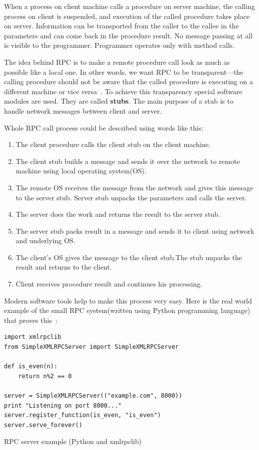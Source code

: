 When a process on client machine calls a
procedure on server machine, the calling process on client is suspended, and
execution of the called procedure takes place on server. Information can be
transported from the caller to the callee in the parameters and can come back in the procedure result.
No message passing at all is visible to the programmer. Programmer operates only
with method calls.

The idea behind RPC is to make a remote procedure call look as much as possible
like a local one. In other words, we want RPC to be transparent—the calling
procedure should not be aware that the called procedure is executing on a different
machine or vice versa~\cite{tanenbaum07}. To achieve this transparency special
software modules are used. They are called \textbf{stubs}. The main purpose
of a stub is to handle network messages between client and server. 

Whole RPC call process could be described using words like this: 
\begin{enumerate}
\item The client procedure calls the client stub on the client machine.
\item The client stub builds a message and sends it over the network to remote
machine using local operating system(OS).
\item The remote  OS  receives the message from the network and gives
this message to the server stub. Server stub unpacks the parameters and calls
the server.
\item The server does the work and returns the result to the server stub.
\item The server stub packs result in a message and sends it to client using
network and underlying OS.
\item The client’s OS gives the message to the client stub.The stub unpacks the result and returns to the client.
\item Client receives procedure result and continues his processing.
\end{enumerate}

Modern software tools help to make this process very easy. Here
is the real world example of the small RPC system(written using Python
programming language) that proves this~\cite{xmlrpclib_python_example}:

\begin{listing}[H]
\begin{verbatim}
import xmlrpclib
from SimpleXMLRPCServer import SimpleXMLRPCServer

def is_even(n):
    return n%2 == 0

server = SimpleXMLRPCServer(("example.com", 8000))
print "Listening on port 8000..."
server.register_function(is_even, "is_even")
server.serve_forever()
\end{verbatim}
\caption{RPC server example (Python and xmlrpclib)}
\label{lst:rpc_server_python_example}
\end{listing}

